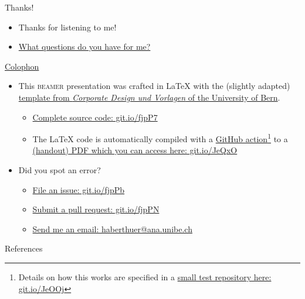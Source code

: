 \begin{frame}{Thanks!}
	\begin{itemize}
		\item Thanks for listening to me!
		\item<2> \href{https://twitter.com/jackiantonovich/status/1195699076056178691}{What questions do you have for me?}
	\end{itemize}
\end{frame}

\begin{frame}{\href{https://en.wikipedia.org/wiki/Colophon_(publishing)}{Colophon}}
	\begin{itemize}
		\item This \textsc{beamer} presentation was crafted in \LaTeX\xspace with the (slightly adapted) \href{http://intern.unibe.ch/dienstleistungen/corporate_design_und_vorlagen/praesentationen/index_ger.html}{template from \emph{Corporate Design und Vorlagen} of the University of Bern}.
		\begin{itemize}
			\item \href{https://github.com/habi/lecture.microtomography/}{Complete source code: git.io/fjpP7}
			\item The \LaTeX\xspace code is automatically compiled with a \href{https://github.com/actions}{GitHub action}\footnote{Details on how this works are specified in a \href{https://github.com/habi/latex-test/}{small test repository here: git.io/JeOOj}} to a \href{https://habi.github.io/Lecture.Microtomography/XRayMicroTomography.Handout.pdf}{(handout) PDF which you can access here: git.io/JeQxO}
		\end{itemize}
		\item Did you spot an error?
		\begin{itemize}
			\item \href{https://github.com/habi/lecture.microtomography/issues}{File an issue: git.io/fjpPb}
			\item \href{https://github.com/habi/lecture.microtomography/pulls}{Submit a pull request: git.io/fjpPN}
			\item \href{mailto:haberthuer@ana.unibe.ch?subject=Error\%20in\%20the\%20(micro)-tomography\%20lecture\&body=https://xkcd.com/386/}{Send me an email: haberthuer@ana.unibe.ch}
		\end{itemize}
	\end{itemize}
\end{frame}

\begin{frame}{References}
	\renewcommand*{\bibfont}{\tiny}
	\printbibliography
\end{frame}


